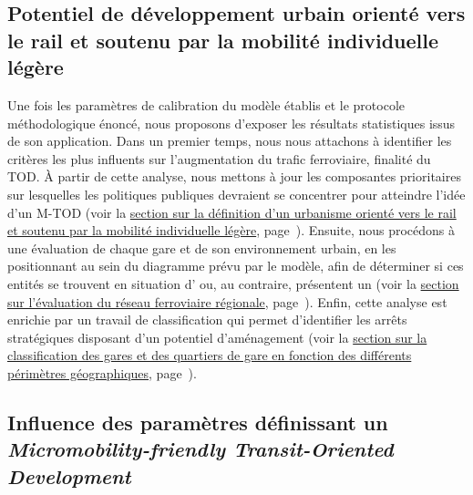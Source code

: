 \begin{refsegment}
    \newpage
\section{Potentiel de développement urbain orienté vers le rail et soutenu par la mobilité individuelle légère
    \label{chap6:resultats-modele}
    }

Une fois les paramètres de calibration du modèle établis et le protocole méthodologique énoncé, nous proposons d’exposer les résultats statistiques issus de son application. Dans un premier temps, nous nous attachons à identifier les critères les plus influents sur l'augmentation du trafic ferroviaire, finalité du \acrshort{TOD}. À partir de cette analyse, nous mettons à jour les composantes prioritaires sur lesquelles les politiques publiques devraient se concentrer pour atteindre l'idée d'un \acrshort{M-TOD} (voir la \hyperref[chap6:results-influence-indicateurs]{section sur la définition d'un urbanisme orienté vers le rail et soutenu par la mobilité individuelle légère}, page~\pageref{chap6:results-influence-indicateurs}). Ensuite, nous procédons à une évaluation de chaque gare et de son environnement urbain, en les positionnant au sein du diagramme prévu par le modèle, afin de déterminer si ces entités se trouvent en situation d’ ou, au contraire, présentent un  (voir la \hyperref[chap6:results-caracterisation-gares]{section sur l'évaluation du réseau ferroviaire régionale}, page~\pageref{chap6:results-caracterisation-gares}). Enfin, cette analyse est enrichie par un travail de classification qui permet d’identifier les arrêts stratégiques disposant d’un potentiel d’aménagement (voir la \hyperref[chap6:results-classification-gares]{section sur la classification des gares et des quartiers de gare en fonction des différents périmètres géographiques}, page~\pageref{chap6:results-classification-gares}).%

\subsection{Influence des paramètres définissant un \textsl{Micromobility-friendly Transit-Oriented Development}
    \label{chap6:results-influence-indicateurs}
    }


\end{refsegment}
